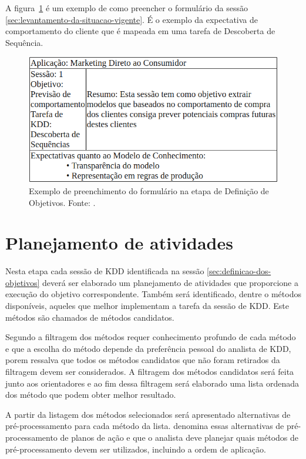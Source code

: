 \documentclass[diss,capa]{texufpel}
\begin{document}
A figura~\ref{fig:formulario-etapa-definicao-objetivo} é um exemplo de como preencher o formulário da sessão \ref{sec:levantamento-da-situacao-vigente}. É o exemplo da expectativa de comportamento do cliente que é mapeada em uma tarefa de Descoberta de Sequência.

\begin{figure}[htbp]
  \centering \includegraphics[scale=.4]{imagens/formulario-etapa-definicao-objetivo.png}
  \caption{Exemplo de preenchimento do formulário na etapa de Definição de Objetivos. Fonte: \cite{goldschmidt2015data}.}
  \label{fig:formulario-etapa-definicao-objetivo}
\end{figure}

\section{Planejamento de atividades}
\label{sec:planejamento-de-atividades}

Nesta etapa cada sessão de KDD identificada na sessão \ref{sec:definicao-dos-objetivos} deverá ser elaborado um planejamento de atividades que proporcione a execução do objetivo correspondente. Também será identificado, dentre o métodos disponíveis, aqueles que melhor implementam a tarefa da sessão de KDD. Este métodos são chamados de métodos candidatos.

Segundo \citet{goldschmidt2015data} a filtragem dos métodos requer conhecimento profundo de cada método e que a escolha do método depende da preferência pessoal do analista de KDD, porem ressalva que todos os métodos candidatos que não foram retirados da filtragem devem ser considerados. A filtragem dos métodos candidatos será feita junto aos orientadores e ao fim dessa filtragem será elaborado uma lista ordenada dos método que podem obter melhor resultado.

A partir da listagem dos métodos selecionados será apresentado alternativas de pré-processamento para cada método da lista. \citet{goldschmidt2015data} denomina essas alternativas de pré-processamento de planos de ação e que o analista deve planejar quais métodos de pré-processamento devem ser utilizados, incluindo a ordem de aplicação.
\end{document}
